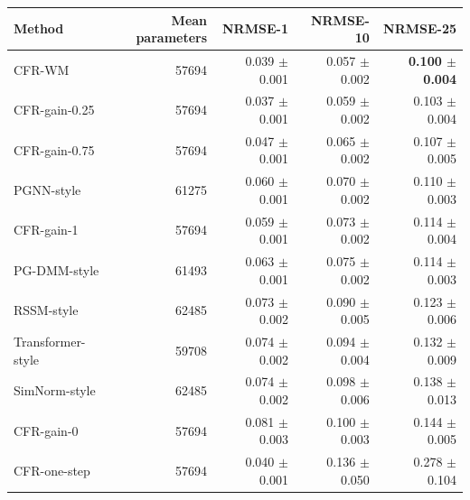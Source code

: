 \begin{tabular}{lrrrr}
\toprule
Method & Mean parameters & NRMSE-1 & NRMSE-10 & NRMSE-25 \\
\midrule
CFR-WM & 57694 & 0.039 $\pm$ 0.001 & 0.057 $\pm$ 0.002 & \textbf{0.100 $\pm$ 0.004} \\
CFR-gain-0.25 & 57694 & 0.037 $\pm$ 0.001 & 0.059 $\pm$ 0.002 & 0.103 $\pm$ 0.004 \\
CFR-gain-0.75 & 57694 & 0.047 $\pm$ 0.001 & 0.065 $\pm$ 0.002 & 0.107 $\pm$ 0.005 \\
PGNN-style & 61275 & 0.060 $\pm$ 0.001 & 0.070 $\pm$ 0.002 & 0.110 $\pm$ 0.003 \\
CFR-gain-1 & 57694 & 0.059 $\pm$ 0.001 & 0.073 $\pm$ 0.002 & 0.114 $\pm$ 0.004 \\
PG-DMM-style & 61493 & 0.063 $\pm$ 0.001 & 0.075 $\pm$ 0.002 & 0.114 $\pm$ 0.003 \\
RSSM-style & 62485 & 0.073 $\pm$ 0.002 & 0.090 $\pm$ 0.005 & 0.123 $\pm$ 0.006 \\
Transformer-style & 59708 & 0.074 $\pm$ 0.002 & 0.094 $\pm$ 0.004 & 0.132 $\pm$ 0.009 \\
SimNorm-style & 62485 & 0.074 $\pm$ 0.002 & 0.098 $\pm$ 0.006 & 0.138 $\pm$ 0.013 \\
CFR-gain-0 & 57694 & 0.081 $\pm$ 0.003 & 0.100 $\pm$ 0.003 & 0.144 $\pm$ 0.005 \\
CFR-one-step & 57694 & 0.040 $\pm$ 0.001 & 0.136 $\pm$ 0.050 & 0.278 $\pm$ 0.104 \\
\bottomrule
\end{tabular}
